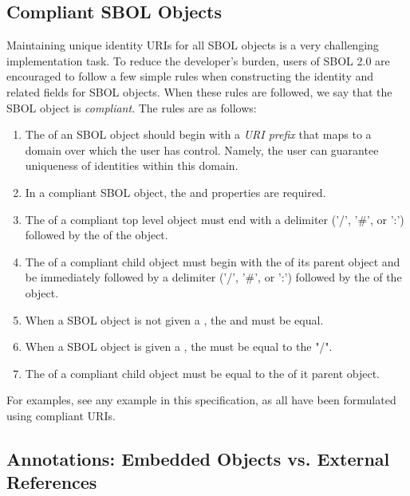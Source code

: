 
\subsection{Compliant SBOL Objects}
\label{sec:compliant}

Maintaining unique identity URIs for all SBOL objects is a very challenging implementation task.  To reduce the developer's burden, users of SBOL 2.0 are encouraged to follow a few simple rules when constructing the identity and related fields for SBOL objects.  When these rules are followed, we say that the SBOL object is \emph{compliant}.  The rules are as follows:
\begin{enumerate}
\item The  of an SBOL object should begin with a \emph{URI prefix} that maps to a domain over which the user has control.  Namely, the user can guarantee uniqueness of identities within this domain.
\item In a compliant SBOL object, the  and  properties are required.
\item The  of a compliant top level object must end with a delimiter ('/', '\#', or ':') followed by the  of the object. 
\item The  of a compliant child object must begin with the  of its parent object and be immediately followed by a delimiter ('/', '\#', or ':') followed by the  of the object.
\item When a SBOL object is not given a , the  and  must be equal.
\item When a SBOL object is given a , the  must be equal to the "/".
\item The  of a compliant child object must be equal to the  of it parent object.
\end{enumerate}

For examples, see any example in this specification, as all have been
formulated using compliant URIs.

\subsection{Annotations: Embedded Objects vs. External References}

